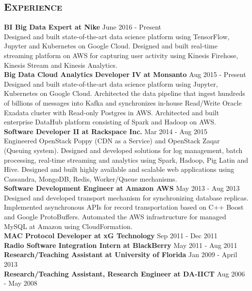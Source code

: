 \begin{resume}
\section{\textsc{Experience}}
\textbf{BI Big Data Expert at Nike} \hfill June 2016 - Present\\
Designed and built state-of-the-art data science platform using TensorFlow, Jupyter and Kubernetes on Google Cloud. Designed and built real-time streaming platform on AWS for capturing user activity using Kinesis Firehose, Kinesis Stream and Kinesis Analytics.\\
\textbf{Big Data Cloud Analytics Developer IV at Monsanto} \hfill Aug 2015 - Present\\
Designed and built state-of-the-art data science platform using Jupyter, Kubernetes on Google Cloud. Architected the data pipeline that ingest hundreds of billions of messages into Kafka and synchronizes in-house Read/Write Oracle Exadata cluster with Read-only Postgres in AWS. Architected and built enterprise DataHub platform consisting of Spark and Hadoop on AWS.\\
\textbf{Software Developer II at Rackspace Inc.} \hfill Mar 2014 - Aug 2015\\
Engineered OpenStack Poppy (CDN as a Service) and OpenStack Zaqar (Queuing system). Designed and developed solutions for log management, batch processing, real-time streaming and analytics using Spark, Hadoop, Pig Latin and Hive. Designed and built highly available and scalable web applications using Cassandra, MongoDB, Redis, Worker/Queue mechanisms.\\
\textbf{Software Development Engineer at Amazon AWS} \hfill May 2013 - Aug 2013\\
Designed and developed transport mechanism for synchronizing database replicas. Implemented asynchronous APIs for record transportation based on C++ Boost and Google ProtoBuffers. Automated the AWS infrastructure for managed MySQL at Amazon using CloudFormation.\\
\textbf{MAC Protocol Developer at xG Technology} \hfill Sep 2011 - Dec 2011\\
\textbf{Radio Software Integration Intern at BlackBerry} \hfill May 2011 - Aug 2011\\
\textbf{Research/Teaching Assistant at University of Florida} \hfill Jan 2009 - April 2013\\
\textbf{Research/Teaching Assistant, Research Engineer at DA-IICT} \hfill Aug 2006 - May 2008

\begin{formatb}
  \\
  \body\\
\end{formatb}


\end{resume}
